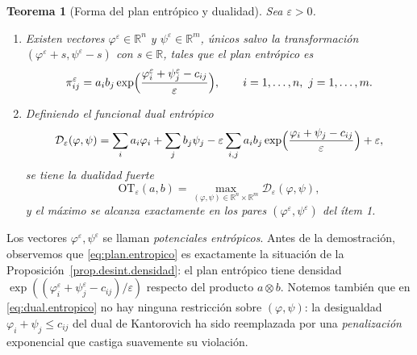 \documentclass[12pt, a4paper]{amsbook}
\newcommand{\R}{{\mathbb R}}
\newtheorem{teo}{Teorema}[section]
\theoremstyle{remark}
\theoremstyle{definition}
\numberwithin{section}{chapter}
\numberwithin{subsection}{section}
\numberwithin{equation}{section}
\numberwithin{figure}{chapter}
\begin{document}
\begin{teo}[Forma del plan entrópico y dualidad]\label{teo.dual.entropico}
Sea $\varepsilon>0$.
\begin{enumerate}
\item Existen vectores $\varphi^\varepsilon\in\R^n$ y $\psi^\varepsilon\in\R^m$,
únicos salvo la transformación $(\varphi^\varepsilon+s,\psi^\varepsilon-s)$ con
$s\in\R$, tales que el plan entrópico es
\begin{equation}\label{eq:plan.entropico}
\pi^\varepsilon_{ij}
=a_ib_j\exp\Bigl(\frac{\varphi^\varepsilon_i+\psi^\varepsilon_j-c_{ij}}{\varepsilon}\Bigr),
\qquad i=1,\dots,n,\ j=1,\dots,m.
\end{equation}
\item Definiendo el \emph{funcional dual entrópico}
\begin{equation}\label{eq:dual.entropico}
\mathcal D_\varepsilon(\varphi,\psi)
=\sum_ia_i\varphi_i+\sum_jb_j\psi_j
-\varepsilon\sum_{i,j}a_ib_j\exp\Bigl(\frac{\varphi_i+\psi_j-c_{ij}}{\varepsilon}\Bigr)
+\varepsilon,
\end{equation}
se tiene la \emph{dualidad fuerte}
\[
\mathrm{OT}_\varepsilon(a,b)=\max_{(\varphi,\psi)\in\R^n\times\R^m}\mathcal D_\varepsilon(\varphi,\psi),
\]
y el máximo se alcanza exactamente en los pares $(\varphi^\varepsilon,\psi^\varepsilon)$
del ítem 1.
\end{enumerate}
\end{teo}

Los vectores $\varphi^\varepsilon,\psi^\varepsilon$ se llaman
\emph{potenciales entrópicos}. Antes de la demostración, observemos que
\eqref{eq:plan.entropico} es exactamente la situación de la
Proposición~\ref{prop.desint.densidad}: el plan entrópico tiene densidad
$\exp((\varphi^\varepsilon_i+\psi^\varepsilon_j-c_{ij})/\varepsilon)$ respecto
del producto $a\otimes b$. Notemos también que en \eqref{eq:dual.entropico}
no hay ninguna restricción sobre $(\varphi,\psi)$: la desigualdad
$\varphi_i+\psi_j\le c_{ij}$ del dual de Kantorovich ha sido reemplazada por
una \emph{penalización} exponencial que castiga suavemente su violación.
\end{document}
